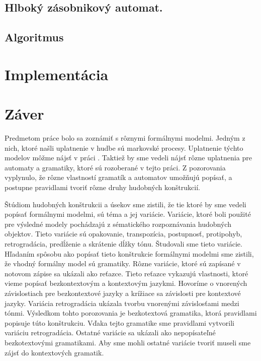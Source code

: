 \section{Hlboký zásobnikový automat.}

\section{Algoritmus}

\chapter{Implementácia}
\label{chap:imp}
\chapter{Záver}
\label{chap:end}
Predmetom práce bolo sa zoznámiť s rôznymi formálnymi modelmi. Jedným z nich, ktoré našli uplatnenie v hudbe sú markovské procesy. Uplatnenie týchto modelov môžme nájsť v práci \cite{afrpub}. Taktiež by sme vedeli nájsť rôzne uplatnenia pre automaty a gramatiky, ktoré sú rozoberané v tejto práci. Z pozorovania vyplynulo, že rôzne vlastností gramatík a automatov umožňujú popísať, a postupne pravidlami tvoriť rôzne druhy hudobných konštrukcií. 

Štúdiom hudobných konštrukcii a úsekov sme zistili, že tie ktoré by sme vedeli popísať formálnymi modelmi, sú téma a jej variácie. Variácie, ktoré boli použité pre výsledné modely pochádzajú z sématického rozpoznávania hudobných objektov. Tieto variácie sú opakovanie, transpozícia, postupnosť, protipohyb, retrogradácia, predĺženie a skrátenie dĺžky tónu. Študovali sme tieto variácie. Hľadaním spôsobu ako popísať tieto konštrukcie formálnymi modelmi sme zistili, že vhodný formálny model sú gramatiky. Rôzne variácie, ktoré sú zapísané v notovom zápise sa ukázali ako reťazce. Tieto reťazce vykazujú vlastnosti, ktoré vieme popísať bezkontextovým a kontextovým jazykmi. Hovoríme o vnorených závislostiach pre bezkontextové jazyky a krížiace sa závislosti pre kontextové jazyky. Variácia retrogradácia ukázala tvorbu vnorenými závislosťami medzi tónmi. Výsledkom tohto porozovania je bezkotextová gramatika, ktorá pravidlami popisuje túto konštrukciu. Vďaka tejto gramatike sme pravidlami vytvorili variáciu retrogradácia. Ostatné variácie sa ukázali ako nepopísateľné bezkotextovými gramatikami. Aby sme mohli ostatné variácie tvoriť museli sme zájsť do kontextových gramatik.


